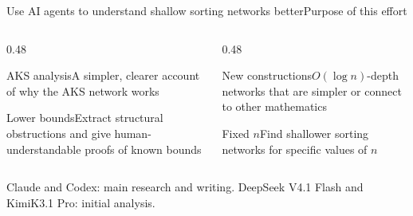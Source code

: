 \documentclass[aspectratio=169,9pt,xcolor=table]{beamer}
\begin{document}
\begin{frame}{Use AI agents to understand shallow sorting networks better}{Purpose of this effort}
\begin{columns}[T]
\begin{column}{0.48\textwidth}
\begin{card}{AKS analysis}A simpler, clearer account of why the AKS network works\end{card}
\begin{card}{Lower bounds}Extract structural obstructions and give human-understandable proofs of known bounds\end{card}
\end{column}
\begin{column}{0.48\textwidth}
\begin{card}{New constructions}$O(\log n)$-depth networks that are simpler or connect to other mathematics\end{card}
\begin{card}{Fixed $n$}Find shallower sorting networks for specific values of $n$\end{card}
\end{column}
\end{columns}
\vspace{0.2cm}
{\scriptsize\color{muted}Claude and Codex: main research and writing. DeepSeek V4.1 Flash and KimiK3.1 Pro: initial analysis.}
\end{frame}
\end{document}
